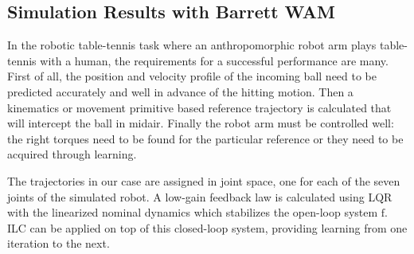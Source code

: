 \documentclass[10pt,a4paper]{article}
\theoremstyle{plain}
\theoremstyle{definition}
\newcommand{\boldvec}[1]{\boldsymbol{\mathrm{#1}}}
\let\vec\boldvec
\newcommand{\dynamics}{\vec{f}}
\begin{document}
\subsection{Simulation Results with Barrett WAM}

In the robotic table-tennis task where an anthropomorphic robot arm plays table-tennis with a human, the requirements for a successful performance are many. First of all, the position and velocity profile of the incoming ball need to be predicted accurately and well in advance of the hitting motion. Then a kinematics or movement primitive based reference trajectory is calculated that will intercept the ball in midair. Finally the robot arm must be controlled well: the right torques need to be found for the particular reference or they need to be acquired through learning.

The trajectories in our case are assigned in joint space, one for each of the seven joints of the simulated robot. A low-gain feedback law is calculated using LQR with the linearized nominal dynamics which stabilizes the open-loop system $\dynamics$. ILC can be applied on top of this closed-loop system, providing learning from one iteration to the next. 
\end{document}
